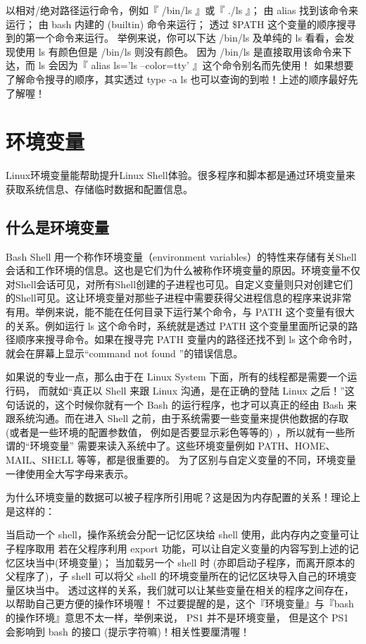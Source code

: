 {以相对/绝对路径运行命令，例如『 /bin/ls 』或『 ./ls 』；
由 alias 找到该命令来运行；
由 bash 内建的 (builtin) 命令来运行；
透过 \$PATH 这个变量的顺序搜寻到的第一个命令来运行。
举例来说，你可以下达 /bin/ls 及单纯的 ls 看看，会发现使用 ls 有颜色但是 /bin/ls 则没有颜色。 因为 /bin/ls 是直接取用该命令来下达，而 ls 会因为『 alias ls='ls --color=tty' 』这个命令别名而先使用！ 如果想要了解命令搜寻的顺序，其实透过 type -a ls 也可以查询的到啦！上述的顺序最好先了解喔！




\section{环境变量}
Linux环境变量能帮助提升Linux Shell体验。很多程序和脚本都是通过环境变量来获取系统信息、存储临时数据和配置信息。

\subsection{什么是环境变量}
Bash Shell 用一个称作环境变量（environment variables）的特性来存储有关Shell会话和工作环境的信息。这也是它们为什么被称作环境变量的原因。环境变量不仅对Shell会话可见，对所有Shell创建的子进程也可见。自定义变量则只对创建它们的Shell可见。这让环境变量对那些子进程中需要获得父进程信息的程序来说非常有用。举例来说，能不能在任何目录下运行某个命令，与 PATH 这个变量有很大的关系。例如运行 ls 这个命令时，系统就是透过 PATH 这个变量里面所记录的路径顺序来搜寻命令。如果在搜寻完 PATH 变量内的路径还找不到 ls 这个命令时， 就会在屏幕上显示“command not found ”的错误信息。

如果说的专业一点，那么由于在 Linux System 下面，所有的线程都是需要一个运行码， 而就如“真正以 Shell 来跟 Linux 沟通，是在正确的登陆 Linux 之后！”这句话说的，这个时候你就有一个 Bash 的运行程序，也才可以真正的经由 Bash 来跟系统沟通。而在进入 Shell 之前，由于系统需要一些变量来提供他数据的存取 (或者是一些环境的配置参数值， 例如是否要显示彩色等等的) ，所以就有一些所谓的“环境变量” 需要来读入系统中了。这些环境变量例如 PATH、HOME、MAIL、SHELL 等等，都是很重要的。 为了区别与自定义变量的不同，环境变量一律使用全大写字母来表示。


为什么环境变量的数据可以被子程序所引用呢？这是因为内存配置的关系！理论上是这样的：

当启动一个 shell，操作系统会分配一记忆区块给 shell 使用，此内存内之变量可让子程序取用
若在父程序利用 export 功能，可以让自定义变量的内容写到上述的记忆区块当中(环境变量)；
当加载另一个 shell 时 (亦即启动子程序，而离开原本的父程序了)，子 shell 可以将父 shell 的环境变量所在的记忆区块导入自己的环境变量区块当中。
透过这样的关系，我们就可以让某些变量在相关的程序之间存在，以帮助自己更方便的操作环境喔！ 不过要提醒的是，这个『环境变量』与『bash 的操作环境』意思不太一样，举例来说， PS1 并不是环境变量， 但是这个 PS1 会影响到 bash 的接口 (提示字符嘛)！相关性要厘清喔！

}
